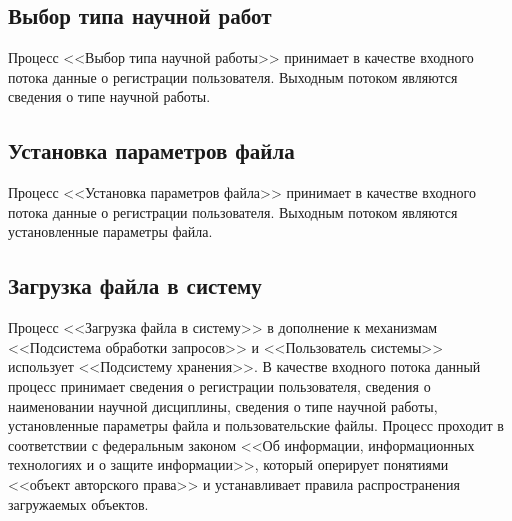 \documentclass[a4paper,14pt]{extarticle}
\begin{document}
\subsection{Выбор типа научной работ}
Процесс <<Выбор типа научной работы>> принимает в качестве входного потока данные о регистрации пользователя. Выходным потоком являются сведения о типе научной работы.


\subsection{Установка параметров файла}
Процесс <<Установка параметров файла>> принимает в качестве входного потока данные о регистрации пользователя. Выходным потоком являются установленные параметры файла.


\subsection{Загрузка файла в систему}
Процесс <<Загрузка файла в систему>> в дополнение к механизмам <<Подсистема обработки запросов>> и <<Пользователь системы>> использует <<Подсистему хранения>>. В качестве входного потока данный процесс принимает сведения о регистрации пользователя, сведения о наименовании научной дисциплины, сведения о типе научной работы, установленные параметры файла и пользовательские файлы. Процесс проходит в соответствии с федеральным законом <<Об информации, информационных технологиях и о защите информации>>, который оперирует понятиями <<объект авторского права>> и устанавливает правила распространения загружаемых объектов.
\end{document}
